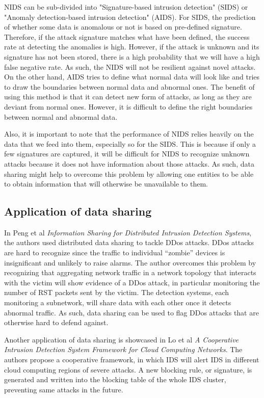 \begin{background}
NIDS can be sub-divided into "Signature-based intrusion detection" (SIDS) or "Anomaly detection-based intrusion detection" (AIDS). For SIDS, the prediction of whether some data is anomalous or not is based on pre-defined signature. Therefore, if the attack signature matches what have been defined, the success rate at detecting the anomalies is high. However, if the attack is unknown and its signature has not been stored, there is a high probability that we will have a high false negative rate. As such, the NIDS will not be resilient against novel attacks. On the other hand, AIDS tries to define what normal data will look like and tries to draw the boundaries between normal data and abnormal ones. The benefit of using this method is that it can detect new form of attacks, as long as they are deviant from normal ones. However, it is difficult to define the right boundaries between normal and abnormal data.

Also, it is important to note that the performance of NIDS relies heavily on the data that we feed into them, especially so for the SIDS. This is because if only a few signatures are captured, it will be difficult for NIDS to recognize unknown attacks because it does not have information about those attacks. As such, data sharing might help to overcome this problem by allowing one entities to be able to obtain information that will otherwise be unavailable to them.


\subsection{Application of data sharing}
In Peng et al \textit{Information Sharing for Distributed Intrusion Detection Systems}, the authors used distributed data sharing to tackle DDos attacks. DDos attacks are hard to recognize since the traffic to individual “zombie” devices is insignificant and unlikely to raise alarms. The author overcomes this problem by recognizing that aggregating network traffic in a network topology that interacts with the victim will show evidence of a DDos attack, in particular monitoring the number of RST packets sent by the victim. The detection systems, each monitoring a subnetwork, will share data with each other once it detects abnormal traffic. As such, data sharing can be used to flag DDos attacks that are otherwise hard to defend against.

Another application of data sharing is showcased in Lo et al \textit{A Cooperative Intrusion Detection System Framework for Cloud Computing Networks}. The authors propose a cooperative framework, in which IDS will alert IDS in different cloud computing regions of severe attacks. A new blocking rule, or signature, is generated and written into the blocking table of the whole IDS cluster, preventing same attacks in the future.


\end{background}
